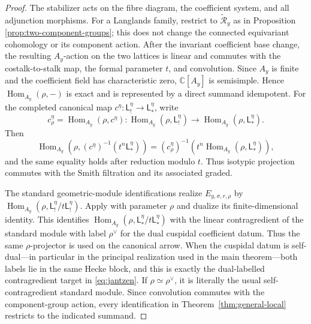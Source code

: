 \documentclass[11pt]{amsart}
\theoremstyle{definition}
\theoremstyle{remark}
\begin{document}
\begin{proof}
The stabilizer acts on the fibre diagram, the coefficient system, and all
adjunction morphisms.  For a Langlands family, restrict to
$\widetilde{\mathcal R}_y$ as in Proposition
\ref{prop:two-component-groups}; this does not change the connected
equivariant cohomology or its component action.  After the invariant
coefficient base change, the resulting
$A_y$-action on the two lattices is linear and commutes
with the costalk-to-stalk map, the formal parameter $t$, and
convolution.  Since $A_y$ is finite and the coefficient field has
characteristic zero, $\mathbb C[A_y]$ is semisimple.  Hence
$\operatorname{Hom}_{A_y}(\rho,-)$ is exact and is represented by a direct
summand idempotent.  For the completed canonical map
$c^\eta:\mathsf L_!^\eta\to\mathsf L_*^\eta$, write
\[
 c_\rho^\eta=\operatorname{Hom}_{A_y}(\rho,c^\eta):
 \operatorname{Hom}_{A_y}(\rho,\mathsf L_!^\eta)
 \longrightarrow
 \operatorname{Hom}_{A_y}(\rho,\mathsf L_*^\eta).
\]
Then
\[
 \operatorname{Hom}_{A_y}\!\left(
  \rho,(c^\eta)^{-1}(t^n\mathsf L_*^\eta)\right)
 =(c_\rho^\eta)^{-1}\!\left(t^n
   \operatorname{Hom}_{A_y}(\rho,\mathsf L_*^\eta)\right),
\]
and the same equality holds after reduction modulo $t$.
Thus isotypic projection commutes with the Smith filtration and its
associated graded.

The standard geometric-module identifications realize
$E_{y,\sigma,r,\rho}$ by
$\operatorname{Hom}_{A_y}(\rho,\mathsf L_!^\eta/t\mathsf L_!^\eta)$.  Apply
\cite[Theorem~C(b)]{Solleveld} with parameter $\rho$ and dualize its
finite-dimensional identity.  This identifies
$\operatorname{Hom}_{A_y}(\rho,
 \mathsf L_*^\eta/t\mathsf L_*^\eta)$ with the linear contragredient of the
standard module with label $\rho^\vee$ for the dual cuspidal coefficient
datum.
Thus the same $\rho$-projector is used on the canonical arrow.  When the
cuspidal datum is self-dual---in particular in the principal realization
used in the main theorem---both labels lie in the same Hecke block, and this
is exactly the dual-labelled contragredient target in
\eqref{eq:jantzen}.  If $\rho\simeq\rho^\vee$, it is literally the usual
self-contragredient standard module.
Since convolution commutes with the component-group action, every
identification in Theorem~\ref{thm:general-local} restricts to the indicated
summand.
\end{proof}
\end{document}
